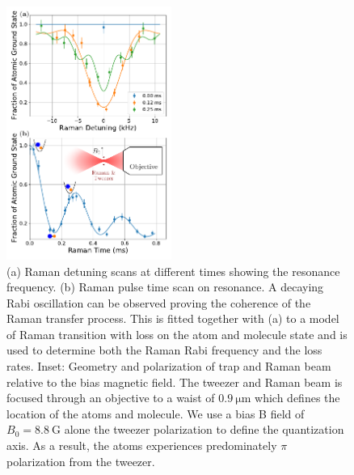 \documentclass[aps,prl,twocolumn,10pt,superscriptaddress]{revtex4-1}
\begin{document}
\begin{figure}[ht!]
  \includegraphics[width=0.48\textwidth]{fig2.pdf}
  \caption{
    (a) Raman detuning scans at different times showing the resonance frequency.
    (b) Raman pulse time scan on resonance.
    A decaying Rabi oscillation can be observed proving the coherence of
    the Raman transfer process.
    This is fitted together with (a) to a model of Raman transition
    with loss on the atom and molecule state and is used to determine
    both the Raman Rabi frequency and the loss rates.
    Inset: Geometry and polarization of trap and Raman beam relative to the bias magnetic field.
    The tweezer and Raman beam is focused through an objective to a waist of $0.9~\mathrm{\mu m}$
    which defines the location of the atoms and molecule.
    We use a bias B field of $B_0=8.8~\mathrm{G}$ alone the tweezer polarization
    to define the quantization axis.
    As a result, the atoms experiences predominately $\pi$ polarization from the tweezer.
    \label{f-raman}}
\end{figure}
\end{document}
